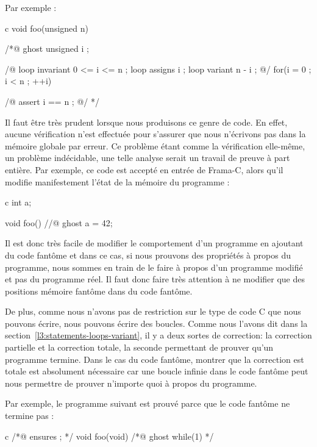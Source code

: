 Par exemple :

\begin{CodeBlock}{c}
void foo(unsigned n){
 /*@ ghost
   unsigned i ;

   /@
     loop invariant 0 <= i <= n ;
     loop assigns i ;
     loop variant n - i ;
   @/
   for(i = 0 ; i < n ; ++i){

   }
   /@ assert i == n ; @/
 */
}
\end{CodeBlock}





Il faut être très prudent lorsque nous produisons ce genre de code. En effet,
aucune vérification n'est effectuée pour s'assurer que nous n'écrivons pas dans
la mémoire globale par erreur. Ce problème étant comme la vérification elle-même,
un problème indécidable, une telle analyse serait un travail de preuve à part
entière. Par exemple, ce code est accepté en entrée de Frama-C, alors qu'il
modifie manifestement l'état de la mémoire du programme :



\begin{CodeBlock}{c}
int a;

void foo(){
  //@ ghost a = 42;
}
\end{CodeBlock}



Il est donc très facile de modifier le comportement d'un programme en ajoutant
du code fantôme et dans ce cas, si nous prouvons des propriétés à propos du
programme, nous sommes en train de le faire à propos d'un programme modifié et
pas du programme réel. Il faut donc faire très attention à ne modifier que des
positions mémoire fantôme dans du code fantôme.


De plus, comme nous n'avons pas de restriction sur le type de code C que nous
pouvons écrire, nous pouvons écrire des boucles. Comme nous l'avons dit dans la
section~\ref{l3:statements-loops-variant}, il y a deux sortes de correction: la
correction partielle et la correction totale, la seconde permettant de prouver
qu'un programme termine. Dans le cas du code fantôme, montrer que la correction
est totale est absolument nécessaire car une boucle infinie dans le code fantôme
peut nous permettre de prouver n'importe quoi à propos du programme.


Par exemple, le programme suivant est prouvé parce que le code fantôme ne termine
pas :

\begin{CodeBlock}{c}
/*@ ensures \false ; */
void foo(void){
  /*@ ghost
    while(1){}
  */
}
\end{CodeBlock}


